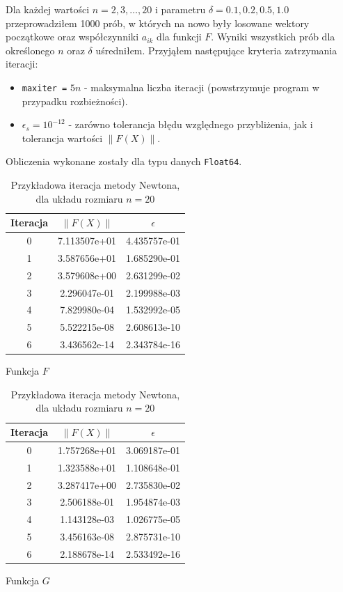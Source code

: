 \documentclass[11pt,wide]{mwart}
\begin{document}
Dla każdej wartości $ n = 2, 3, \ldots, 20 $ i parametru $ \delta = 0.1, 0.2, 0.5, 1.0 $ przeprowadziłem 1000 prób, w których na nowo były losowane wektory początkowe oraz współczynniki $ a_{ik} $ dla funkcji $ F $. Wyniki wszystkich prób dla określonego $ n $ oraz $ \delta $ uśredniłem. Przyjąłem następujące kryteria zatrzymania iteracji:
\begin{itemize}
\item \texttt{maxiter =} $ 5n $ - maksymalna liczba iteracji (powstrzymuje program w przypadku rozbieżności).
\item $ \epsilon_s = 10^{-12} $ - zarówno tolerancja błędu względnego przybliżenia, jak i tolerancja wartości $ \|F(X)\| $.
\end{itemize}
Obliczenia wykonane zostały dla typu danych \texttt{Float64}.
\begin{center}
\begin{table}[!htb]
    \begin{subtable}{.5\linewidth}
      \centering
\begin{tabular}{ |c | c | c| } \hline
Iteracja & $\|F(X)\|$ & $\epsilon$ \\ \hline
0 & 7.113507e+01 & 4.435757e-01 \\ 
1 & 3.587656e+01 & 1.685290e-01 \\ 
2 & 3.579608e+00 & 2.631299e-02 \\ 
3 & 2.296047e-01 & 2.199988e-03 \\ 
4 & 7.829980e-04 & 1.532992e-05 \\ 
5 & 5.522215e-08 & 2.608613e-10 \\ 
6 & 3.436562e-14 & 2.343784e-16 \\  \hline
\end{tabular}
\caption{Funkcja $ F $}
\end{subtable}%
\begin{subtable}{.5\linewidth}
\centering
\begin{tabular}{| c | c | c |} \hline
Iteracja & $\|F(X)\|$ & $\epsilon$ \\ \hline
0 & 1.757268e+01 & 3.069187e-01 \\ 
1 & 1.323588e+01 & 1.108648e-01 \\ 
2 & 3.287417e+00 & 2.735830e-02 \\ 
3 & 2.506188e-01 & 1.954874e-03 \\ 
4 & 1.143128e-03 & 1.026775e-05 \\ 
5 & 3.456163e-08 & 2.875731e-10 \\ 
6 & 2.188678e-14 & 2.533492e-16 \\ \hline
\end{tabular}
\caption{Funkcja $ G $}
\end{subtable}
\caption{Przykładowa iteracja metody Newtona, dla układu rozmiaru $ n = 20 $ }
\end{table}
\end{center}
\end{document}
